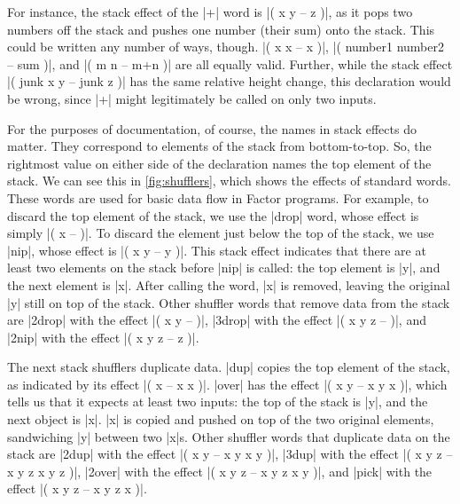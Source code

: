 For instance, the stack effect of the \factor|+| word is
%
\factor|( x y -- z )|,
%
as it pops two numbers off the stack and pushes one number (their sum) onto the
stack.  This could be written any number of ways, though.
%
\factor|( x x -- x )|,
%
\factor|( number1 number2 -- sum )|,
%
and
%
\factor|( m n -- m+n )|
%
are all equally valid.  Further, while the stack effect
%
\factor|( junk x y -- junk z )|
%
has the same relative height change, this declaration would be wrong, since
\factor|+| might legitimately be called on only two inputs.


For the purposes of documentation, of course, the names in stack effects do
matter.  They correspond to elements of the stack from bottom-to-top.  So, the
rightmost value on either side of the declaration names the top element of the
stack.  We can see this in \vref{fig:shufflers}, which shows the effects of
standard  words.  These words are used for basic data flow
in Factor programs.  For example, to discard the top element of the stack, we
use the \factor|drop| word, whose effect is simply
%
\factor|( x -- )|.
%
To discard the element just below the top of the stack, we use \factor|nip|,
whose effect is
%
\factor|( x y -- y )|.
%
This stack effect indicates that there are at least two elements on the stack
before \factor|nip| is called: the top element is \factor|y|, and the next
element is \factor|x|.  After calling the word, \factor|x| is removed, leaving
the original \factor|y| still on top of the stack.  Other shuffler words that
remove data from the stack are
%
\factor|2drop| with the effect \factor|( x y -- )|,
%
\factor|3drop| with the effect \factor|( x y z -- )|, and
%
\factor|2nip| with the effect \factor|( x y z -- z )|.

The next stack shufflers duplicate data.  \factor|dup| copies the top element
of the stack, as indicated by its effect \factor|( x -- x x )|.  \factor|over|
has the effect \factor|( x y -- x y x )|, which tells us that it expects at
least two inputs: the top of the stack is \factor|y|, and the next object is
\factor|x|.  \factor|x| is copied and pushed on top of the two original
elements, sandwiching \factor|y| between two \factor|x|s.  Other shuffler words
that duplicate data on the stack are
%
\factor|2dup| with the effect \factor|( x y -- x y x y )|,
%
\factor|3dup| with the effect \factor|( x y z -- x y z x y z )|,
%
\factor|2over| with the effect \factor|( x y z -- x y z x y )|, and
%
\factor|pick| with the effect \factor|( x y z -- x y z x )|.

